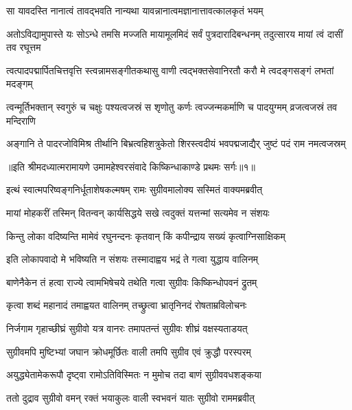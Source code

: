 \twolineshloka
{सा यावदस्ति नानात्वं तावद्भवति नान्यथा}
{यावन्नानात्वमज्ञानात्तावत्कालकृतं भयम्} %

\threelineshloka
{अतोऽविद्यामुपास्ते यः सोऽन्धे तमसि मज्जति}
{मायामूलमिदं सर्वं पुत्रदारादिबन्धनम्}
{तदुत्सारय मायां त्वं दासीं तव रघूत्तम} %

\fourlineindentedshloka
{त्वत्पादपद्मार्पितचित्तवृत्ति\-}
{स्त्वन्नामसङ्गीतकथासु वाणी}
{त्वद्भक्तसेवानिरतौ करौ मे}
{त्वदङ्गसङ्गं लभतां मदङ्गम्} %

\fourlineindentedshloka
{त्वन्मूर्तिभक्तान् स्वगुरुं च चक्षुः}
{पश्यत्वजस्रं स शृणोतु कर्णः}
{त्वज्जन्मकर्माणि च पादयुग्मम्}
{व्रजत्वजस्रं तव मन्दिराणि} %

\fourlineindentedshloka
{अङ्गानि ते पादरजोविमिश्र\-}
{तीर्थानि बिभ्रत्वहिशत्रुकेतो}
{शिरस्त्वदीयं भवपद्मजाद्यैर्\-}
{जुष्टं पदं राम नमत्वजस्रम्} %

{॥इति श्रीमदध्यात्मरामायणे उमामहेश्वरसंवादे किष्किन्धाकाण्डे
प्रथमः सर्गः॥१॥
}




\twolineshloka
{इत्थं स्वात्मपरिष्वङ्गनिर्धूताशेषकल्मषम्}
{रामः सुग्रीवमालोक्य सस्मितं वाक्यमब्रवीत्} %

\twolineshloka
{मायां मोहकरीं तस्मिन् वितन्वन् कार्यसिद्धये}
{सखे त्वदुक्तं यत्तन्मां सत्यमेव न संशयः} %

\twolineshloka
{किन्तु लोका वदिष्यन्ति मामेवं रघुनन्दनः}
{कृतवान् किं कपीन्द्राय सख्यं कृत्वाग्निसाक्षिकम्} %

\twolineshloka
{इति लोकापवादो मे भविष्यति न संशयः}
{तस्मादाह्वय भद्रं ते गत्वा युद्धाय वालिनम्} %

\twolineshloka
{बाणेनैकेन तं हत्वा राज्ये त्वामभिषेचये}
{तथेति गत्वा सुग्रीवः किष्किन्धोपवनं द्रुतम्} %

\twolineshloka
{कृत्वा शब्दं महानादं तमाह्वयत वालिनम्}
{तच्छ्रुत्वा भ्रातृनिनदं रोषताम्रविलोचनः} %

\twolineshloka
{निर्जगाम गृहाच्छीघ्रं सुग्रीवो यत्र वानरः}
{तमापतन्तं सुग्रीवः शीघ्रं वक्षस्यताडयत्} %

\twolineshloka
{सुग्रीवमपि मुष्टिभ्यां जघान क्रोधमूर्छितः}
{वाली तमपि सुग्रीव एवं क्रुद्धौ परस्परम्} %

\twolineshloka
{अयुद्ध्येतामेकरूपौ दृष्ट्वा रामोऽतिविस्मितः}
{न मुमोच तदा बाणं सुग्रीववधशङ्कया} %

\twolineshloka
{ततो दुद्राव सुग्रीवो वमन् रक्तं भयाकुलः}
{वाली स्वभवनं यातः सुग्रीवो राममब्रवीत्} %


